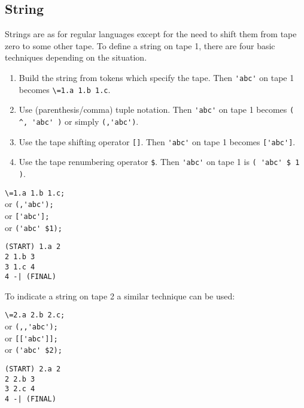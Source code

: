 \subsection{String}
Strings are as for regular languages except for the need to shift them from
tape zero to some other tape.
To define a string on tape 1, there are four basic techniques depending on
the situation.
\begin{enumerate}
\item Build the string from tokens which specify the tape.
Then \verb#'abc'# on tape 1 becomes \verb#\=1.a 1.b 1.c#.

\item Use (parenthesis/comma) tuple notation.
Then \verb#'abc'# on tape 1 becomes \verb#( ^, 'abc' )# or simply
\verb#(,'abc')#.

\item Use the tape shifting operator \verb#[]#.
Then \verb#'abc'# on tape 1 becomes \verb#['abc']#.

\item Use the tape renumbering operator \verb#$#.
Then \verb#'abc'# on tape 1 is \verb#( 'abc' $ 1 )#.
\end{enumerate}
\begin{center}\begin{minipage}[t]{3in}\begin{minipage}[t]{3in}\begin{tabbing}
\qquad \= \verb#\=1.a 1.b 1.c;#\\
or \> \verb#(,'abc');#\\
or \> \verb#['abc'];#\\
or \> \verb#('abc' $1);#\\
\end{tabbing}\end{minipage}\end{minipage}
\begin{minipage}[t]{1.6in}\begin{verbatim}
(START) 1.a 2
2 1.b 3
3 1.c 4
4 -| (FINAL)
\end{verbatim}\end{minipage}\end{center}
To indicate a string on tape 2 a similar technique can be used:
\begin{center}\begin{minipage}[t]{3in}\begin{minipage}[t]{3in}\begin{tabbing}
\qquad \= \verb#\=2.a 2.b 2.c;#\\
or \> \verb#(,,'abc');#\\
or \> \verb#[['abc']];#\\
or \> \verb#('abc' $2);#\\
\end{tabbing}\end{minipage}\end{minipage}
\begin{minipage}[t]{1.6in}\begin{verbatim}
(START) 2.a 2
2 2.b 3
3 2.c 4
4 -| (FINAL)
\end{verbatim}\end{minipage}\end{center}
